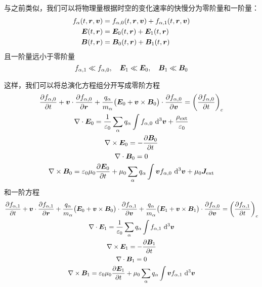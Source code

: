 与之前类似，我们可以将物理量根据时空的变化速率的快慢分为零阶量和一阶量：
\begin{subequations}\begin{align}
f_\alpha(t, \bm{r}, \bm{v}) &= f_{\alpha,0}(t, \bm{r}, \bm{v}) + f_{\alpha,1}(t, \bm{r}, \bm{v}) \\
\bm{E}(t, \bm{r}) &= \bm{E}_0(t, \bm{r}) + \bm{E}_1(t, \bm{r}) \\
\bm{B}(t, \bm{r}) &= \bm{B}_0(t, \bm{r}) + \bm{B}_1(t, \bm{r})
\end{align}\end{subequations}
且一阶量远小于零阶量
\begin{equation}
f_{\alpha,1} \ll f_{\alpha,0}, \quad
\bm{E}_1 \ll \bm{E}_0, \quad
\bm{B}_1 \ll \bm{B}_0
\end{equation}

这样，我们可以将总演化方程组分开写成零阶方程
\begin{subequations}\begin{gather}
\pdv{f_{\alpha,0}}{t}
+ \bm{v} \cdot \pdv{f_{\alpha,0}}{\bm{r}}
+ \frac{q_\alpha}{m_\alpha} \big(
    \bm{E}_0 + \bm{v} \times \bm{B}_0
\big) \cdot \pdv{f_{\alpha,0}}{\bm{v}}
= \left( \pdv{f_{\alpha,0}}{t} \right)_c \\
\nabla \cdot {\bm{E}_0} = \frac{1}{\varepsilon_0}
\sum_\alpha q_\alpha \int f_{\alpha,0} \, \mathop{}\!\mathrm{d}^3 \bm{v}
+ \frac{\rho_{\text{ext}}}{\varepsilon_0} \\
\nabla \times {\bm{E}_0} = - \pdv{\bm{B}_0}{t} \\
\nabla \cdot {\bm{B}_0} = 0 \\
\nabla \times {\bm{B}_0} = \varepsilon_0 \mu_0 \pdv{\bm{E}_0}{t}
+ \mu_0 \sum_\alpha q_\alpha \int \bm{v} f_{\alpha,0} \, \mathop{}\!\mathrm{d}^3 \bm{v}
+ \mu_0 \bm{J}_{\text{ext}}
\end{gather}\end{subequations}
和一阶方程
\begin{subequations}\begin{gather}
\pdv{f_{\alpha,1}}{t}
+ \bm{v} \cdot \pdv{f_{\alpha,1}}{\bm{r}}
+ \frac{q_\alpha}{m_\alpha} \big(
    \bm{E}_0 + \bm{v} \times \bm{B}_0
\big) \cdot \pdv{f_{\alpha,1}}{\bm{v}}
+ \frac{q_\alpha}{m_\alpha} \big(
    \bm{E}_1 + \bm{v} \times \bm{B}_1
\big) \cdot \pdv{f_{\alpha,0}}{\bm{v}}
= \left( \pdv{f_{\alpha,1}}{t} \right)_c \\
\nabla \cdot {\bm{E}_1} = \frac{1}{\varepsilon_0}
\sum_\alpha q_\alpha \int f_{\alpha,1} \, \mathop{}\!\mathrm{d}^3 \bm{v} \\
\nabla \times {\bm{E}_1} = - \pdv{\bm{B}_1}{t} \\
\nabla \cdot {\bm{B}_1} = 0 \\
\nabla \times {\bm{B}_1} = \varepsilon_0 \mu_0 \pdv{\bm{E}_1}{t}
+ \mu_0 \sum_\alpha q_\alpha \int \bm{v} f_{\alpha,1} \, \mathop{}\!\mathrm{d}^3 \bm{v}
\end{gather}\end{subequations}

